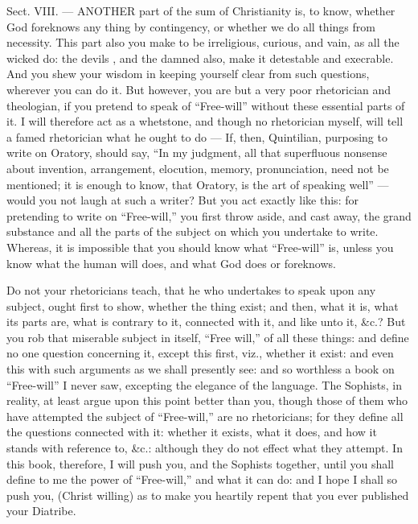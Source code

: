 Sect. VIII. — ANOTHER part of the sum of Christianity is, to know, whether God foreknows any thing by contingency, or whether we do all things from necessity. This part also you make to be irreligious, curious, and vain, as all the wicked do: the devils , and the damned also, make it detestable and execrable. And you shew your wisdom in keeping yourself clear from such questions, wherever you can do it. But however, you are but a very poor rhetorician and theologian, if you pretend to speak of “Free-will” without these essential parts of it. I will therefore act as a whetstone, and though no rhetorician myself, will tell a famed rhetorician what he ought to do — If, then, Quintilian, purposing to write on Oratory, should say, “In my judgment, all that superfluous nonsense about invention, arrangement, elocution, memory, pronunciation, need not be mentioned; it is enough to know, that Oratory, is the art of speaking well” — would you not laugh at such a writer? But you act exactly like this: for pretending to write on “Free-will,” you first throw aside, and cast away, the grand substance and all the parts of the subject on which you undertake to write. Whereas, it is impossible that you should know what “Free-will” is, unless you know what the human will does, and what God does or foreknows.

Do not your rhetoricians teach, that he who undertakes to speak upon any subject, ought first to show, whether the thing exist; and then, what it is, what its parts are, what is contrary to it, connected with it, and like unto it, \&c.? But you rob that miserable subject in itself, “Free will,” of all these things: and define no one question concerning it, except this first, viz., whether it exist: and even this with such arguments as we shall presently see: and so worthless a book on “Free-will” I never saw, excepting the elegance of the language. The Sophists, in reality, at least argue upon this point better than you, though those of them who have attempted the subject of “Free-will,” are no rhetoricians; for they define all the questions connected with it: whether it exists, what it does, and how it stands with reference to, \&c.: although they do not effect what they attempt. In this book, therefore, I will push you, and the Sophists together, until you shall define to me the power of “Free-will,” and what it can do: and I hope I shall so push you, (Christ willing) as to make you heartily repent that you ever published your Diatribe.


